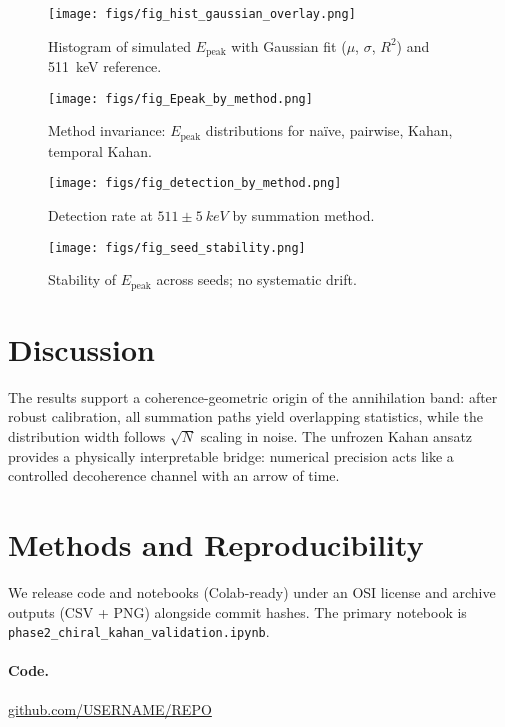 \documentclass[11pt]{article}
\newcommand{\Epeak}{E_{\mathrm{peak}}}
\begin{document}
\begin{figure}[t]
  \centering
  \texttt{[image: figs/fig\_hist\_gaussian\_overlay.png]}
  \caption{Histogram of simulated \(\Epeak\) with Gaussian fit (\(\mu\), \(\sigma\), \(R^2\)) and \SI{511}{keV} reference.}
  \label{fig:hist}
\end{figure}

\begin{figure}[t]
  \centering
  \texttt{[image: figs/fig\_Epeak\_by\_method.png]}
  \caption{Method invariance: \(\Epeak\) distributions for na\"ive, pairwise, Kahan, temporal Kahan.}
  \label{fig:box}
\end{figure}

\begin{figure}[t]
  \centering
  \texttt{[image: figs/fig\_detection\_by\_method.png]}
  \caption{Detection rate at \(511\pm\SI{5}{keV}\) by summation method.}
  \label{fig:det}
\end{figure}

\begin{figure}[t]
  \centering
  \texttt{[image: figs/fig\_seed\_stability.png]}
  \caption{Stability of \(\Epeak\) across seeds; no systematic drift.}
  \label{fig:seed}
\end{figure}

\section{Discussion}
The results support a coherence-geometric origin of the annihilation band: after robust calibration, all summation paths yield overlapping statistics, while the distribution width follows \(\sqrt{N}\) scaling in noise. The unfrozen Kahan ansatz provides a physically interpretable bridge: numerical precision acts like a controlled decoherence channel with an arrow of time.

\section{Methods and Reproducibility}
We release code and notebooks (Colab-ready) under an OSI license and archive outputs (CSV + PNG) alongside commit hashes. The primary notebook is
\texttt{phase2\_chiral\_kahan\_validation.ipynb}.

\paragraph{Code.} \href{https://github.com/USERNAME/REPO}{github.com/USERNAME/REPO}
\end{document}
